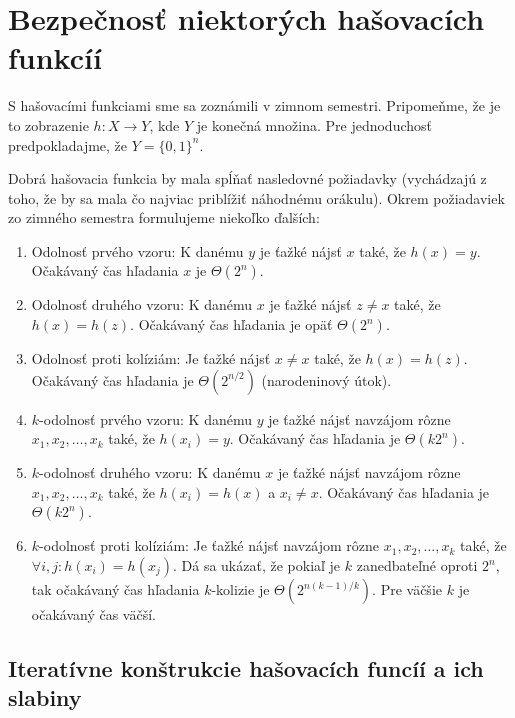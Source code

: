 \section{Bezpečnosť niektorých hašovacích funkcíí}

S hašovacími funkciami sme sa zoznámili v zimnom semestri.
Pripomeňme, že je to zobrazenie $h: X \to Y$, kde $Y$ je konečná množina.
Pre jednoduchosť predpokladajme, že $Y = \{0,1\}^n$. 

Dobrá hašovacia funkcia by mala spĺňať nasledovné požiadavky 
(vychádzajú z toho, že by sa mala čo najviac priblížiť náhodnému orákulu). 
Okrem požiadaviek zo zimného semestra formulujeme niekoľko ďalších:
\begin{enumerate}
    \itemsep -1.2mm
    \item Odolnosť prvého vzoru: K danému $y$ je ťažké nájsť $x$ také, 
        že $h(x) = y$. Očakávaný čas hľadania $x$ je $\Theta(2^n)$.

    \item Odolnosť druhého vzoru: K danému $x$ je ťažké nájsť 
        $z \neq x$ také, že $h(x) = h(z)$. Očakávaný čas hľadania je opäť
        $\Theta(2^n)$.

    \item Odolnosť proti kolíziám: Je ťažké nájsť $x \neq x$ také, 
        že $h(x) = h(z)$. Očakávaný čas hľadania je $\Theta(2^{n/2})$ 
        (narodeninový útok).

    \vskip 0.5cm

    \item $k$-odolnosť prvého vzoru: K danému $y$ je ťažké nájsť navzájom rôzne 
        $x_1, x_2, \dots, x_k$ také, že $h(x_i) = y$. Očakávaný čas hľadania
        je $\Theta(k 2^n)$.

    \item $k$-odolnosť druhého vzoru: K danému $x$ je ťažké nájsť
        navzájom rôzne 
        $x_1, x_2, \dots, x_k$ také, že $h(x_i) = h(x)$ a $x_i \neq x$.
        Očakávaný čas hľadania je $\Theta(k 2^n)$.

    \item $k$-odolnosť proti kolíziám: Je ťažké nájsť navzájom rôzne 
        $x_1, x_2, \dots, x_k$ také, že $\forall i, j\colon h(x_i) = h(x_j)$. 
        Dá sa ukázať, že pokiaľ je $k$ zanedbateľné oproti $2^n$, tak očakávaný 
        čas hľadania $k$-kolizie je $\Theta(2^{n(k-1)/k})$.
        Pre väčšie $k$ je očakávaný čas väčší.
\end{enumerate}

\subsection {Iteratívne konštrukcie hašovacích funcíí a ich slabiny}

